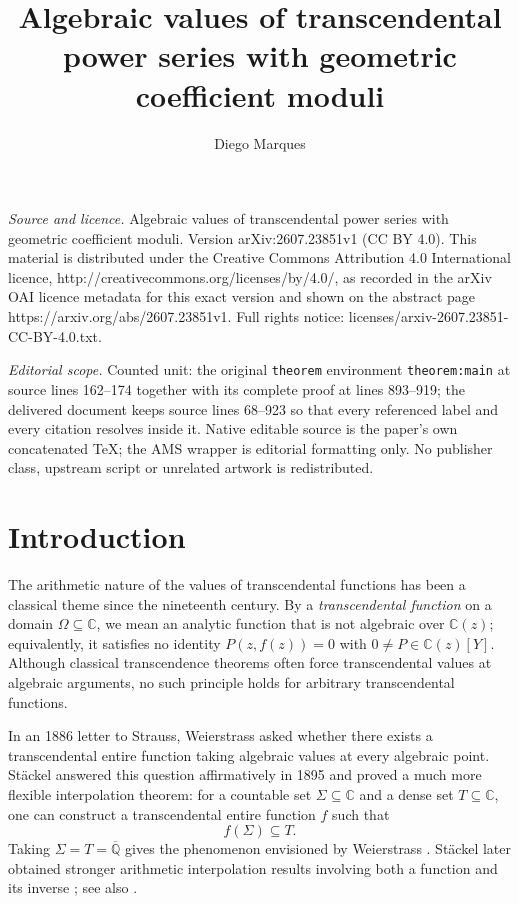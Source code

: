 \documentclass[10pt,a4paper]{amsart}
\numberwithin{equation}{section}
\newcommand{\C}{\mathbb C}
\newcommand{\Qbar}{\overline{\mathbb Q}}
\begin{document}
\title[Algebraic values of transcendental power series with geometr]{Algebraic values of transcendental power series with geometric coefficient moduli}
\author{Diego Marques}
\date{}
\maketitle
\noindent\emph{Source and licence.} Algebraic values of transcendental power series with geometric coefficient moduli. Version arXiv:2607.23851v1 (CC BY 4.0). This material is distributed under the Creative Commons Attribution 4.0 International licence, http://creativecommons.org/licenses/by/4.0/, as recorded in the arXiv OAI licence metadata for this exact version and shown on the abstract page https://arxiv.org/abs/2607.23851v1. Full rights notice: licenses/arxiv-2607.23851-CC-BY-4.0.txt.\par\smallskip
\noindent\textit{Editorial scope.} Counted unit: the original \texttt{theorem} environment \texttt{theorem:main} at source lines 162--174 together with its complete proof at lines 893--919; the delivered document keeps source lines 68--923 so that every referenced label and every citation resolves inside it. Native editable source is the paper's own concatenated TeX; the AMS wrapper is editorial formatting only. No publisher class, upstream script or unrelated artwork is redistributed.
\section{Introduction}

The arithmetic nature of the values of transcendental functions has been a
classical theme since the nineteenth century. By a \emph{transcendental
function} on a domain $\Omega\subseteq\C$, we mean an analytic function that
is not algebraic over $\C(z)$; equivalently, it satisfies no identity
$P(z,f(z))=0$ with $0\neq P\in\C(z)[Y]$. Although classical transcendence
theorems often force transcendental values at algebraic arguments, no such
principle holds for arbitrary transcendental functions.

In an 1886 letter to Strauss, Weierstrass asked whether there exists a
transcendental entire function taking algebraic values at every algebraic
point. St\"ackel answered this question affirmatively in 1895 and proved a
much more flexible interpolation theorem: for a countable set
$\Sigma\subseteq\C$ and a dense set $T\subseteq\C$, one can construct a
transcendental entire function $f$ such that
\[
        f(\Sigma)\subseteq T.
\]
Taking $\Sigma=T=\Qbar$ gives the phenomenon envisioned by Weierstrass
\cite{stackel1895,waldschmidt2003}. St\"ackel later obtained stronger
arithmetic interpolation results involving both a function and its inverse
\cite{stackel1902}; see also
\cite{huangmarquesmereb2010, vanderpoorten1968,waldschmidt2003}.
\end{document}
